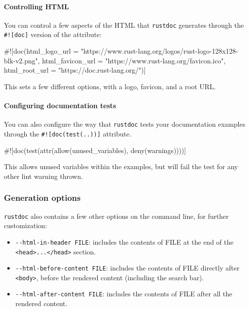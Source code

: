 \documentclass[a4paper,]{book}
\newenvironment{Shaded}{\begin{snugshade}}{\end{snugshade}}
\newcommand{\StringTok}[1]{\textcolor[rgb]{0.31,0.60,0.02}{{#1}}}
\newcommand{\NormalTok}[1]{{#1}}
\let\oldparagraph\paragraph
\renewcommand{\paragraph}[1]{\oldparagraph{#1}\mbox{}}
\begin{document}
\paragraph{Controlling HTML}\label{controlling-html}

You can control a few aspects of the HTML that \texttt{rustdoc}
generates through the \texttt{\#!{[}doc{]}} version of the attribute:

\begin{Shaded}
\begin{Highlighting}[]
\NormalTok{#![doc(html_logo_url = }\StringTok{"https://www.rust-lang.org/logos/rust-logo-128x128-blk-v2.png"}\NormalTok{,}
       \NormalTok{html_favicon_url = }\StringTok{"https://www.rust-lang.org/favicon.ico"}\NormalTok{,}
       \NormalTok{html_root_url = }\StringTok{"https://doc.rust-lang.org/"}\NormalTok{)]}
\end{Highlighting}
\end{Shaded}

This sets a few different options, with a logo, favicon, and a root URL.

\paragraph{Configuring documentation
tests}\label{configuring-documentation-tests}

You can also configure the way that \texttt{rustdoc} tests your
documentation examples through the \texttt{\#!{[}doc(test(..)){]}}
attribute.

\begin{Shaded}
\begin{Highlighting}[]
\NormalTok{#![doc(test(attr(allow(unused_variables), deny(warnings))))]}
\end{Highlighting}
\end{Shaded}

This allows unused variables within the examples, but will fail the test
for any other lint warning thrown.

\subsubsection{Generation options}\label{generation-options}

\texttt{rustdoc} also contains a few other options on the command line,
for further customization:

\begin{itemize}
\itemsep1pt\parskip0pt
\item
  \texttt{-\/-html-in-header\ FILE}: includes the contents of FILE at
  the end of the
  \texttt{\textless{}head\textgreater{}...\textless{}/head\textgreater{}}
  section.
\item
  \texttt{-\/-html-before-content\ FILE}: includes the contents of FILE
  directly after \texttt{\textless{}body\textgreater{}}, before the
  rendered content (including the search bar).
\item
  \texttt{-\/-html-after-content\ FILE}: includes the contents of FILE
  after all the rendered content.
\end{itemize}
\end{document}
